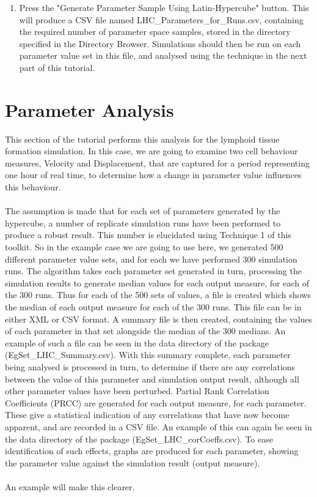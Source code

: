 \documentclass[a4paper,11pt]{article}
\begin{document}
\begin{enumerate}
\item Press the "Generate Parameter Sample Using Latin-Hypercube" button. This will produce a CSV file named LHC\_Parameters\_for\_Runs.csv, containing the required number of parameter space samples, stored in the directory specified in the Directory Browser. Simulations should then be run on each parameter value set in this file, and analysed using the technique in the next part of this tutorial.

\end{enumerate}

\section{Parameter Analysis}
\noindent This section of the tutorial performs this analysis for the lymphoid tissue formation simulation.  In this case, we are going to examine two cell behaviour measures, Velocity and Displacement, that are captured for a period representing one hour of real time, to determine how a change in parameter value influences this behaviour.\\
\\
The assumption is made that for each set of parameters generated by the hypercube, a number of replicate simulation runs have been performed to produce a robust result. This number is elucidated using Technique 1 of this toolkit. So in the example case we are going to use here, we generated 500 different parameter value sets, and for each we have performed 300 simulation runs. The algorithm takes each parameter set generated in turn, processing the simulation results to generate median values for each output measure, for each of the 300 runs. Thus for each of the 500 sets of values, a file is created which shows the median of each output measure for each of the 300 runs. This file can be in either XML or CSV format. A summary file is then created, containing the values of each parameter in that set alongside the median of the 300 medians. An example of such a file can be seen in the data directory of the package (EgSet\_LHC\_Summary.csv). With this summary complete, each parameter being analysed is processed in turn, to determine if there are any correlations between the value of this parameter and simulation output result, although all other parameter values have been perturbed.  Partial Rank Correlation Coefficients (PRCC) are generated for each output measure, for each parameter. These give a statistical indication of any correlations that have now become apparent, and are recorded in a CSV file. An example of this can again be seen in the data directory of the package (EgSet\_LHC\_corCoeffs.csv). To ease identification of such effects, graphs are produced for each parameter, showing the parameter value against the simulation result (output measure).\\
\\
An example will make this clearer.
\end{document}
